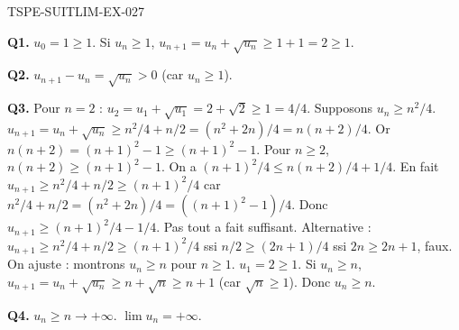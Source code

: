 \begin{corrige}{TSPE-SUITLIM-EX-027}

\textbf{Q1.} $u_0=1\geq 1$. Si $u_n \geq 1$, $u_{n+1}=u_n+\sqrt{u_n} \geq 1+1=2 \geq 1$.

\textbf{Q2.} $u_{n+1}-u_n = \sqrt{u_n} > 0$ (car $u_n \geq 1$).

\textbf{Q3.} Pour $n=2$ : $u_2 = u_1 + \sqrt{u_1} = 2+\sqrt{2} \geq 1 = 4/4$. Supposons $u_n \geq n^2/4$. $u_{n+1} = u_n + \sqrt{u_n} \geq n^2/4 + n/2 = (n^2+2n)/4 = n(n+2)/4$. Or $n(n+2) = (n+1)^2-1 \geq (n+1)^2-1$. Pour $n \geq 2$, $n(n+2) \geq (n+1)^2 - 1$. On a $(n+1)^2/4 \leq n(n+2)/4+1/4$. En fait $u_{n+1} \geq n^2/4+n/2 \geq (n+1)^2/4$ car $n^2/4+n/2 = (n^2+2n)/4 = ((n+1)^2-1)/4$. Donc $u_{n+1} \geq (n+1)^2/4 - 1/4$. Pas tout a fait suffisant. Alternative : $u_{n+1} \geq n^2/4 + n/2 \geq (n+1)^2/4$ ssi $n/2 \geq (2n+1)/4$ ssi $2n \geq 2n+1$, faux. On ajuste : montrons $u_n \geq n$ pour $n \geq 1$. $u_1 = 2 \geq 1$. Si $u_n \geq n$, $u_{n+1} = u_n+\sqrt{u_n} \geq n+\sqrt{n} \geq n+1$ (car $\sqrt{n} \geq 1$). Donc $u_n \geq n$.

\textbf{Q4.} $u_n \geq n \to +\infty$. $\boxed{\lim u_n = +\infty}$.

\end{corrige}
